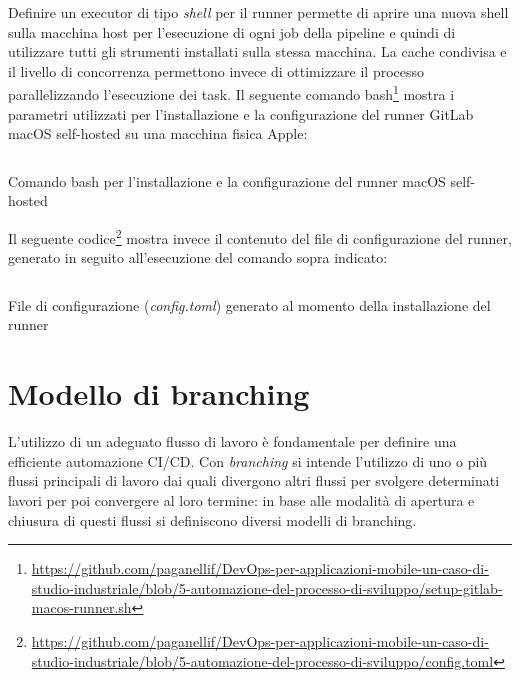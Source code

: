 Definire un executor di tipo \textit{shell} per il runner permette di aprire una nuova shell sulla macchina host per l'esecuzione di ogni job della pipeline e quindi di utilizzare tutti gli strumenti installati sulla stessa macchina. La cache condivisa e il livello di concorrenza permettono invece di ottimizzare il processo parallelizzando l'esecuzione dei task. Il seguente comando bash\footnote{\href{https://github.com/paganellif/DevOps-per-applicazioni-mobile-un-caso-di-studio-industriale/blob/5-automazione-del-processo-di-sviluppo/setup-gitlab-macos-runner.sh}{https://github.com/paganellif/DevOps-per-applicazioni-mobile-un-caso-di-studio-industriale/blob/5-automazione-del-processo-di-sviluppo/setup-gitlab-macos-runner.sh}} mostra i parametri utilizzati per l'installazione e la configurazione del runner GitLab macOS self-hosted su una macchina fisica Apple:

\begin{listing}[H]
    \inputminted{bash}{code/macos-runner-setup.sh}
    \caption{Comando bash per l'installazione e la configurazione del runner macOS self-hosted}
\end{listing}

Il seguente codice\footnote{\href{https://github.com/paganellif/DevOps-per-applicazioni-mobile-un-caso-di-studio-industriale/blob/5-automazione-del-processo-di-sviluppo/config.toml}{https://github.com/paganellif/DevOps-per-applicazioni-mobile-un-caso-di-studio-industriale/blob/5-automazione-del-processo-di-sviluppo/config.toml}} mostra invece il contenuto del file di configurazione del runner, generato in seguito all'esecuzione del comando sopra indicato:

\begin{listing}[H]
    \inputminted{toml}{code/macos-runner-config.toml}
    \caption{File di configurazione (\textit{config.toml}) generato al momento della installazione del runner}
\end{listing}

\section{Modello di branching}
L’utilizzo di un adeguato flusso di lavoro è fondamentale per definire una efficiente automazione CI/CD. Con \textit{branching} si intende l’utilizzo di uno o più flussi principali di lavoro dai quali divergono altri flussi per svolgere determinati lavori per poi convergere al loro termine: in base alle modalità di apertura e chiusura di questi flussi si definiscono diversi modelli di branching.


